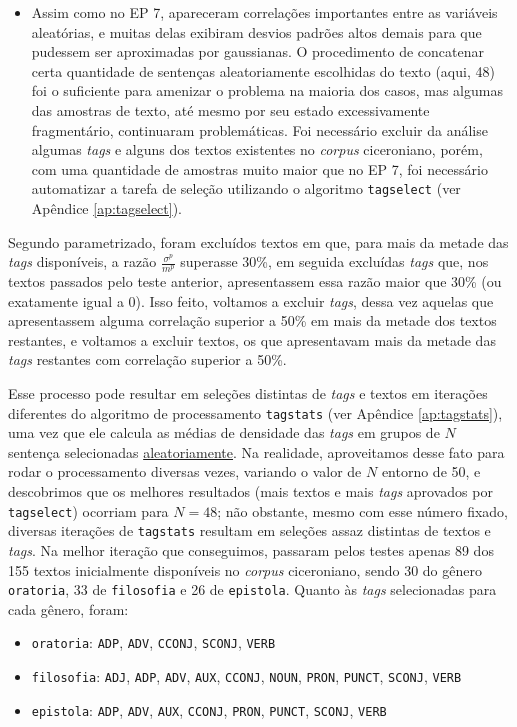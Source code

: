 \documentclass[10pt,a4paper,onecolumn]{article}
\theoremstyle{definition}
\theoremstyle{remark}
\begin{document}
\begin{itemize}
	\item Assim como no EP 7, apareceram correlações importantes entre as variáveis aleatórias, e muitas delas exibiram desvios padrões altos demais para que pudessem ser aproximadas por gaussianas. O procedimento de concatenar certa quantidade de sentenças aleatoriamente escolhidas do texto (aqui, 48) foi o suficiente para amenizar o problema na maioria dos casos, mas algumas das amostras de texto, até mesmo por seu estado excessivamente fragmentário, continuaram problemáticas. Foi necessário excluir da análise algumas \emph{tags} e alguns dos textos existentes no \emph{corpus} ciceroniano, porém, com uma quantidade de amostras muito maior que no EP 7, foi necessário automatizar a tarefa de seleção utilizando o algoritmo \texttt{tagselect} (ver Apêndice \ref{ap:tagselect}). 
\end{itemize}
	
Segundo parametrizado, foram excluídos textos em que, para mais da metade das \emph{tags} disponíveis, a razão $\frac{\sigma^p}{m^p}$ superasse 30\%, em seguida excluídas \emph{tags} que, nos textos passados pelo teste anterior, apresentassem essa razão maior que 30\% (ou exatamente igual a 0). Isso feito, voltamos a excluir \emph{tags}, dessa vez aquelas que apresentassem alguma correlação superior a 50\% em mais da metade dos textos restantes, e voltamos a excluir textos, os que apresentavam mais da metade das \emph{tags} restantes com correlação superior a 50\%.

Esse processo pode resultar em seleções distintas de \emph{tags} e textos em iterações diferentes do algoritmo de processamento \texttt{tagstats} (ver Apêndice \ref{ap:tagstats}), uma vez que ele calcula as médias de densidade das \emph{tags} em grupos de $N$ sentença selecionadas \underline{aleatoriamente}. Na realidade, aproveitamos desse fato para rodar o processamento diversas vezes, variando o valor de $N$ entorno de 50, e descobrimos que os melhores resultados (mais textos e mais \emph{tags} aprovados por \texttt{tagselect}) ocorriam para $N = 48$; não obstante, mesmo com esse número fixado, diversas iterações de \texttt{tagstats} resultam em seleções assaz distintas de textos e \emph{tags}. Na melhor iteração que conseguimos, passaram pelos testes apenas 89 dos 155 textos inicialmente disponíveis no \emph{corpus} ciceroniano, sendo 30 do gênero \texttt{oratoria}, 33 de \texttt{filosofia} e 26 de \texttt{epistola}. Quanto às \emph{tags} selecionadas para cada gênero, foram:
\begin{itemize}
	\item[] \texttt{oratoria}: \texttt{ADP}, \texttt{ADV}, \texttt{CCONJ}, \texttt{SCONJ}, \texttt{VERB}
	\item[] \texttt{filosofia}: \texttt{ADJ}, \texttt{ADP}, \texttt{ADV}, \texttt{AUX}, \texttt{CCONJ}, \texttt{NOUN}, \texttt{PRON}, \texttt{PUNCT}, \texttt{SCONJ}, \texttt{VERB}
	\item[] \texttt{epistola}: \texttt{ADP}, \texttt{ADV}, \texttt{AUX}, \texttt{CCONJ}, \texttt{PRON}, \texttt{PUNCT}, \texttt{SCONJ}, \texttt{VERB}
\end{itemize}
\end{document}

